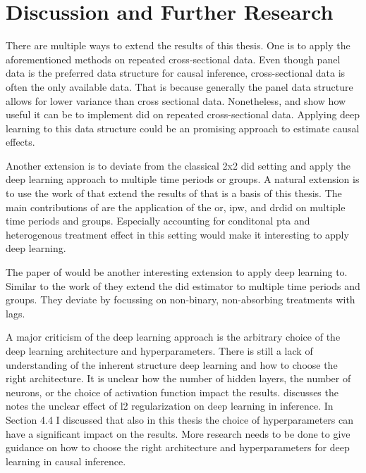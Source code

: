 \section{Discussion and Further Research}

There are multiple ways to extend the results of this thesis.
One is to apply the aforementioned methods on repeated cross-sectional data.
Even though panel data is the preferred data structure for causal inference, cross-sectional data is often the only available data.
That is because generally the panel data structure allows for lower variance than cross sectional data.
Nonetheless, \citet{santannaDoublyRobustDifferenceindifferences2020} and \citet{manfeDifferenceInDifferenceDesignRepeated} show how useful it can be to implement \ac{did} on repeated cross-sectional data.
Applying deep learning to this data structure could be an promising approach to estimate causal effects.

Another extension is to deviate from the classical 2x2 \ac{did} setting and apply the deep learning approach to multiple time periods or groups.
A natural extension is to use the work of \citet{callawayDifferenceinDifferencesMultipleTime2021} that extend the results of \citet{santannaDoublyRobustDifferenceindifferences2020} that is a basis of this thesis.
The main contributions of  \citet{callawayDifferenceinDifferencesMultipleTime2021} are the application of the \ac{or}, \ac{ipw}, and \ac{drdid} on multiple time periods and groups.
Especially accounting for conditonal \ac{pta} and heterogenous treatment effect in this setting would make it interesting to apply deep learning.

The paper of \citet{dechaisemartinDifferenceinDifferencesEstimatorsIntertemporal2024} would be another interesting extension to apply deep learning to.
Similar to the work of \citet{callawayDifferenceinDifferencesMultipleTime2021} they extend the \ac{did} estimator to multiple time periods and groups.
They deviate by focussing on non-binary, non-absorbing treatments with lags.

A major criticism of the deep learning approach is the arbitrary choice of the deep learning architecture and hyperparameters.
There is still a lack of understanding of the inherent structure deep learning and how to choose the right architecture.
It is unclear how the number of hidden layers, the number of neurons, or the choice of activation function impact the results.
\citet{farrellDeepNeuralNetworks2021} discusses the notes the unclear effect of l2 regularization on deep learning in inference.
In Section 4.4 I discussed that also in this thesis the choice of hyperparameters can have a significant impact on the results.
More research needs to be done to give guidance on how to choose the right architecture and hyperparameters for deep learning in causal inference.

